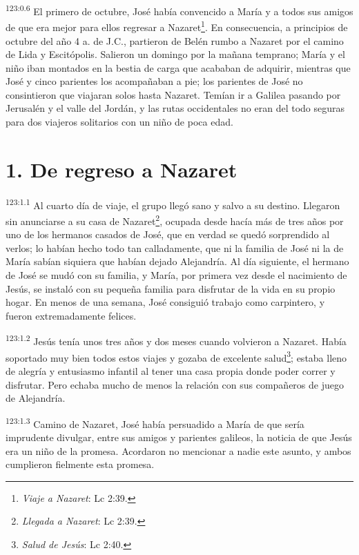 \par
\textsuperscript{123:0.6} El primero de octubre, José había convencido a María y a todos sus amigos de que era mejor para ellos regresar a Nazaret\footnote{\textit{Viaje a Nazaret}: Lc 2:39.}. En consecuencia, a principios de octubre del año 4 a. de J.C., partieron de Belén rumbo a Nazaret por el camino de Lida y Escitópolis. Salieron un domingo por la mañana temprano; María y el niño iban montados en la bestia de carga que acababan de adquirir, mientras que José y cinco parientes los acompañaban a pie; los parientes de José no consintieron que viajaran solos hasta Nazaret. Temían ir a Galilea pasando por Jerusalén y el valle del Jordán, y las rutas occidentales no eran del todo seguras para dos viajeros solitarios con un niño de poca edad.

\section*{1. De regreso a Nazaret}
\par
\textsuperscript{123:1.1} Al cuarto día de viaje, el grupo llegó sano y salvo a su destino. Llegaron sin anunciarse a su casa de Nazaret\footnote{\textit{Llegada a Nazaret}: Lc 2:39.}, ocupada desde hacía más de tres años por uno de los hermanos casados de José, que en verdad se quedó sorprendido al verlos; lo habían hecho todo tan calladamente, que ni la familia de José ni la de María sabían siquiera que habían dejado Alejandría. Al día siguiente, el hermano de José se mudó con su familia, y María, por primera vez desde el nacimiento de Jesús, se instaló con su pequeña familia para disfrutar de la vida en su propio hogar. En menos de una semana, José consiguió trabajo como carpintero, y fueron extremadamente felices.

\par
\textsuperscript{123:1.2} Jesús tenía unos tres años y dos meses cuando volvieron a Nazaret. Había soportado muy bien todos estos viajes y gozaba de excelente salud\footnote{\textit{Salud de Jesús}: Lc 2:40.}; estaba lleno de alegría y entusiasmo infantil al tener una casa propia donde poder correr y disfrutar. Pero echaba mucho de menos la relación con sus compañeros de juego de Alejandría.

\par
\textsuperscript{123:1.3} Camino de Nazaret, José había persuadido a María de que sería imprudente divulgar, entre sus amigos y parientes galileos, la noticia de que Jesús era un niño de la promesa. Acordaron no mencionar a nadie este asunto, y ambos cumplieron fielmente esta promesa.

